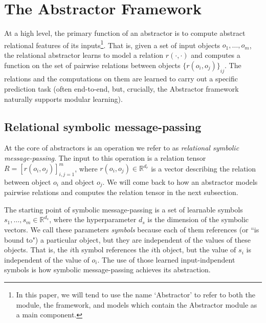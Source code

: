 
\def\m{m}


\section{The Abstractor Framework}
\label{sec:abstractor_framework}

At a high level, the primary function of an abstractor is to compute abstract relational features of its
inputs\footnote{In this paper, we will tend to use the name `Abstractor' to refer to both the module, the framework, and models which contain the Abstractor module as a main component.}. That is, given a set of input objects $o_1, \ldots, o_\m$, the relational abstractor learns to model a relation $r(\cdot, \cdot)$ and computes a function on
the set of pairwise relations between objects ${\{ r(o_i, o_j) \}}_{ij}$. The relations and the computations on them are learned to carry out a specific prediction task (often end-to-end, but, crucially, the Abstractor framework naturally supports modular learning).
\subsection{Relational symbolic message-passing}
\label{ssec:message_passing}

At the core of abstractors is an operation we refer to as \textit{relational symbolic message-passing}.
The input to this operation is a relation tensor $R = \left[r(o_i, o_j)\right]_{i,j=1}^\m$, where $r(o_i, o_j) \in \mathbb{R}^{d_r}$ is a vector describing the relation between object $o_i$ and object $o_j$. We will come back to how an abstractor models pairwise relations and computes the relation tensor in the next subsection.

The starting point of symbolic message-passing is a set of learnable symbols $s_1, \ldots, s_\m \in \mathbb{R}^{d_s}$, where the hyperparameter $d_s$ is the dimension of the symbolic vectors. We call these parameters \textit{symbols} because each of them references (or ``is bound to") a particular object, but they are independent of the values of these objects. That is, the $i$th symbol references the $i$th object, but the value of $s_i$ is independent of the value of $o_i$. The use of those learned input-indpendent symbols is how symbolic message-passing achieves its abstraction.

